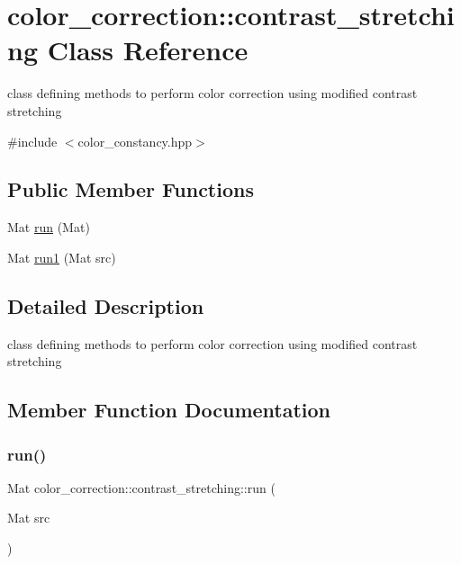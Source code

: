 \hypertarget{classcolor__correction_1_1contrast__stretching}{}\section{color\+\_\+correction\+:\+:contrast\+\_\+stretching Class Reference}
\label{classcolor__correction_1_1contrast__stretching}


class defining methods to perform color correction using modified contrast stretching  




{\ttfamily \#include $<$color\+\_\+constancy.\+hpp$>$}

\subsection*{Public Member Functions}
\begin{DoxyCompactItemize}
\item 
Mat \hyperlink{classcolor__correction_1_1contrast__stretching_a034f45ac1d117193c70e87104a2ee82c}{run} (Mat)
\item 
Mat \hyperlink{classcolor__correction_1_1contrast__stretching_a059efe3142744d161a0022ffeff5b79c}{run1} (Mat src)
\end{DoxyCompactItemize}


\subsection{Detailed Description}
class defining methods to perform color correction using modified contrast stretching 

\subsection{Member Function Documentation}
\mbox{\label{classcolor__correction_1_1contrast__stretching_a034f45ac1d117193c70e87104a2ee82c}} 
\subsubsection{\texorpdfstring{run()}{run()}}
{\footnotesize\ttfamily Mat color\+\_\+correction\+::contrast\+\_\+stretching\+::run (\begin{DoxyParamCaption}\item[{Mat}]{src }\end{DoxyParamCaption})}

